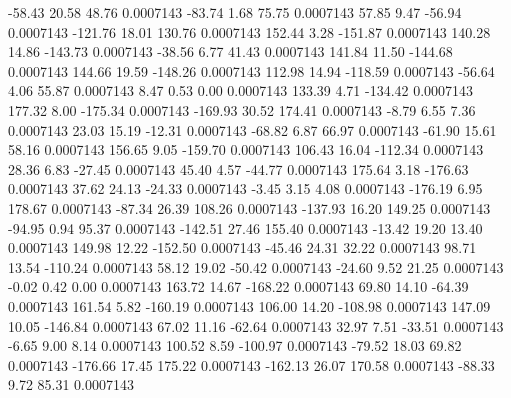       -58.43       20.58       48.76     0.0007143
      -83.74        1.68       75.75     0.0007143
       57.85        9.47      -56.94     0.0007143
     -121.76       18.01      130.76     0.0007143
      152.44        3.28     -151.87     0.0007143
      140.28       14.86     -143.73     0.0007143
      -38.56        6.77       41.43     0.0007143
      141.84       11.50     -144.68     0.0007143
      144.66       19.59     -148.26     0.0007143
      112.98       14.94     -118.59     0.0007143
      -56.64        4.06       55.87     0.0007143
        8.47        0.53        0.00     0.0007143
      133.39        4.71     -134.42     0.0007143
      177.32        8.00     -175.34     0.0007143
     -169.93       30.52      174.41     0.0007143
       -8.79        6.55        7.36     0.0007143
       23.03       15.19      -12.31     0.0007143
      -68.82        6.87       66.97     0.0007143
      -61.90       15.61       58.16     0.0007143
      156.65        9.05     -159.70     0.0007143
      106.43       16.04     -112.34     0.0007143
       28.36        6.83      -27.45     0.0007143
       45.40        4.57      -44.77     0.0007143
      175.64        3.18     -176.63     0.0007143
       37.62       24.13      -24.33     0.0007143
       -3.45        3.15        4.08     0.0007143
     -176.19        6.95      178.67     0.0007143
      -87.34       26.39      108.26     0.0007143
     -137.93       16.20      149.25     0.0007143
      -94.95        0.94       95.37     0.0007143
     -142.51       27.46      155.40     0.0007143
      -13.42       19.20       13.40     0.0007143
      149.98       12.22     -152.50     0.0007143
      -45.46       24.31       32.22     0.0007143
       98.71       13.54     -110.24     0.0007143
       58.12       19.02      -50.42     0.0007143
      -24.60        9.52       21.25     0.0007143
       -0.02        0.42        0.00     0.0007143
      163.72       14.67     -168.22     0.0007143
       69.80       14.10      -64.39     0.0007143
      161.54        5.82     -160.19     0.0007143
      106.00       14.20     -108.98     0.0007143
      147.09       10.05     -146.84     0.0007143
       67.02       11.16      -62.64     0.0007143
       32.97        7.51      -33.51     0.0007143
       -6.65        9.00        8.14     0.0007143
      100.52        8.59     -100.97     0.0007143
      -79.52       18.03       69.82     0.0007143
     -176.66       17.45      175.22     0.0007143
     -162.13       26.07      170.58     0.0007143
      -88.33        9.72       85.31     0.0007143
